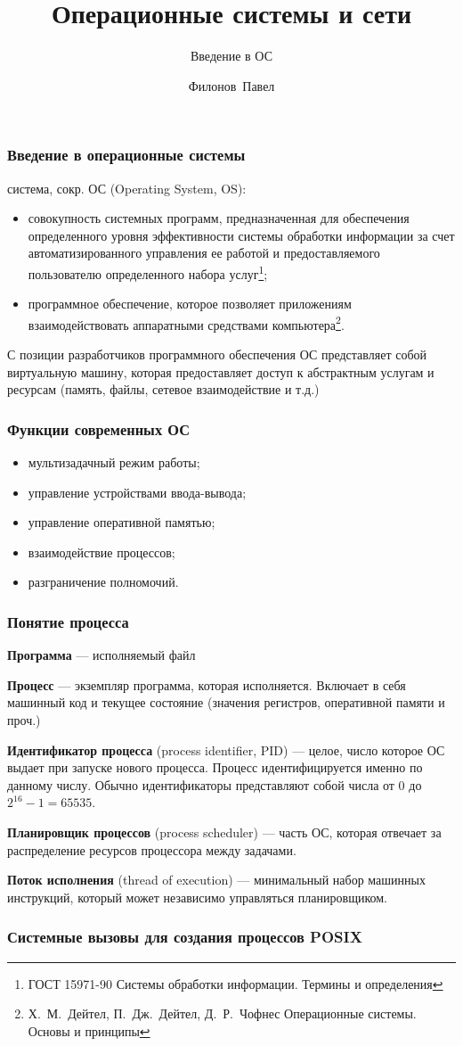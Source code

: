 \documentclass{beamer}
\title{Операционные системы и сети}
\subtitle{Введение в ОС}
\author{Филонов~Павел}
\institute{filonovpv@gmail.com}
\begin{document}
\titlepage
\begin{frame}
    \frametitle{Введение в операционные системы}
    { система}, сокр. ОС (Operating System, OS):
    \begin{itemize}
        \item совокупность 
    системных программ, предназначенная для обеспечения определенного уровня 
    эффективности системы обработки информации за счет автоматизированного 
    управления ее работой и предоставляемого пользователю определенного набора
    услуг\footnote{ГОСТ 15971-90 Системы обработки информации. Термины и определения};
        \item программное обеспечение, которое позволяет приложениям взаимодействовать
    аппаратными средствами компьютера\footnote{Х.~М.~Дейтел, П.~Дж.~Дейтел, Д.~Р.~Чофнес
    Операционные системы. Основы и принципы}.
    \end{itemize}
    С позиции разработчиков программного обеспечения ОС представляет собой виртуальную
    машину, которая предоставляет доступ к абстрактным услугам и ресурсам (память, файлы, сетевое взаимодействие и т.д.)
\end{frame}

\begin{frame}
    \frametitle{Функции современных ОС}
    \begin{itemize}
        \item мультизадачный режим работы;
        \item управление устройствами ввода-вывода;
        \item управление оперативной памятью;
        \item взаимодействие процессов;
        \item разграничение полномочий.
    \end{itemize}
\end{frame}

\begin{frame}
    \frametitle{Понятие процесса}
    {\bf Программа} --- исполняемый файл

    {\bf Процесс} --- экземпляр программа, которая исполняется. Включает в себя
    машинный код и текущее состояние (значения регистров, оперативной памяти и проч.)

    {\bf Идентификатор процесса} (process identifier, PID) --- целое, число которое ОС
    выдает при запуске нового процесса. Процесс идентифицируется именно по данному числу.
    Обычно идентификаторы представляют собой числа от 0 до $2^16 - 1= 65535$.

    {\bf Планировщик процессов} (process scheduler) --- часть ОС, которая отвечает за
    распределение ресурсов процессора между задачами.

    {\bf Поток исполнения} (thread of execution) --- минимальный набор машинных инструкций, который может независимо управляться планировщиком.
\end{frame}

\begin{frame}
    \frametitle{Системные вызовы для создания процессов POSIX}

\end{frame}
\end{document}
